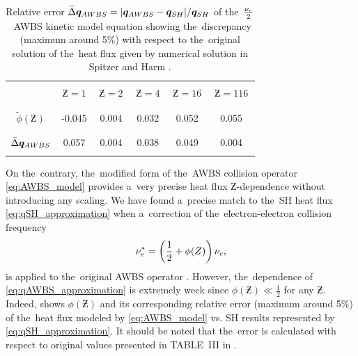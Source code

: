 \begin{table}
\begin{center}
  \begin{tabular}{c|ccccc}
    \hline\hline\\
    & $\,\Zbar=1\,$ & $\,\Zbar=2\,$ & $\,\Zbar=4\,$ & $\,\Zbar=16\,$ & $\,\Zbar=116\,$ \\\\
    \hline\\
    $\tilde{\phi}(\Zbar)$ & -0.045 & 0.004 & 0.032 & 0.052 & 0.055 \\\\
    \hline\\
    $\bar{\Delta}\boldsymbol{q}_{AWBS}$ & 0.057 & 0.004 & 0.038 & 0.049 & 0.004 \\\\
    \hline\hline
  \end{tabular}
  \caption{
  Relative error $\bar{\Delta}\boldsymbol{q}_{AWBS} = 
  |\boldsymbol{q}_{AWBS} - \boldsymbol{q}_{SH}| / \boldsymbol{q}_{SH}$ of 
  the~$\frac{\nu_{e}}{2}$~AWBS
  kinetic model equation  showing the~discrepancy 
  (maximum around 5$\%$) with respect to the~original solution of 
  the~heat flux given by numerical solution in Spitzer and Harm 
  \cite{SpitzerHarm_PR1953}.
  }
\label{app_tab:qAWBS}
\end{center}
\end{table}

On the~contrary, the~modified form of the~AWBS collision operator 
\eqref{eq:AWBS_model} provides a~very precise heat flux $\Zbar$-dependence
without introducing any scaling. We have found a~precise match to the~SH 
heat flux \eqref{eq:qSH_approximation}
when a~correction of the~electron-electron collision frequency
\begin{equation}
  \nu_{e}^* = \left(\frac{1}{2} + \phi(Z)\right) \nu_{e} ,
  \label{app_eq:qAWBS_approximation}
\end{equation}
is applied to the~original AWBS operator \cite{AWBS_PRL1986, Sorbo_2015}.
However, the~dependence of \eqref{eq:qAWBS_approximation} is extremely week
since $\phi(\Zbar)\ll\frac{1}{2}$ for any $\Zbar$.
Indeed,  shows $\phi(\Zbar)$ and its corresponding relative
error (maximum around 5$\%$) of the~heat flux modeled by 
\eqref{eq:AWBS_model} vs. SH results represented by 
\eqref{eq:qSH_approximation}. It should be noted that the~error is calculated 
with respect to original values presented in TABLE~III in 
\cite{SpitzerHarm_PR1953}.

